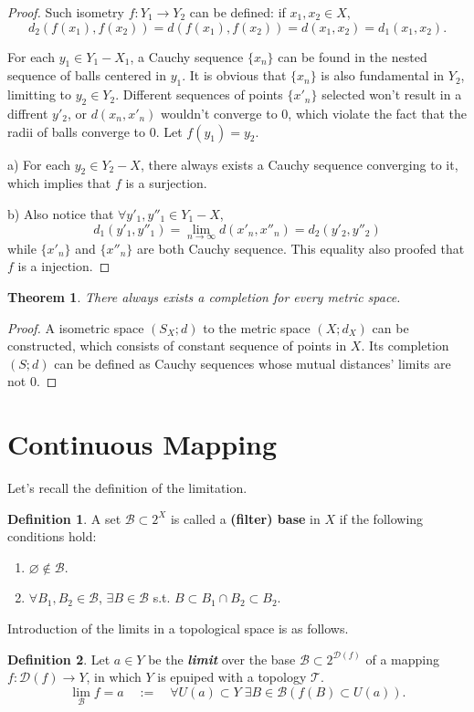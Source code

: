 \documentclass[openany]{book}
\newcommand*{\indexbf}[1]{\emph{\textbf{#1}}\index{#1}} %
\theoremstyle{plain}
\newtheorem{theorem}{Theorem}[section] %
\theoremstyle{definition}
\newtheorem{definition}{Definition}[section] %
\begin{document}
\begin{proof}
Such isometry $f:Y_1\to Y_2$ can be defined: if $x_1,x_2\in X$, 
\[
	d_2( f(x_1) , f(x_2) )=d(f(x_1), f(x_2)) = d(x_1 , x_2)=d_1(x_1, x_2).
\]

For each $y_1\in Y_1 - X_1$, a Cauchy sequence $\{x_n\}$ can be found in the nested sequence of balls centered in $y_1$. It is obvious that $\{x_n\}$ is also fundamental in $Y_2$, limitting to $y_2\in Y_2$. Different sequences of points $\{x'_n\}$ selected won't result in a diffrent $y'_2$, or $d(x_n,x'_n)$ wouldn't converge to $0$, which violate the fact that the radii of balls converge to $0$. Let $f(y_1)=y_2$. 

a) For each $y_2\in Y_2 - X$, there always exists a Cauchy sequence converging to it, which implies that $f$ is a surjection.

b) Also notice that $\forall y'_1,y''_1\in Y_1 - X$,
\[
	d_1(y'_1,y''_1)= \lim_{n\to\infty} d(x'_n,x''_n)=d_2(y'_2,y''_2)
\]
while $\{x'_n\}$ and $\{x''_n\}$ are both Cauchy sequence. This equality also proofed that $f$ is a injection.
\end{proof}
\begin{theorem}\label{completion_exists}
There always exists a completion for every metric space.
\end{theorem}
\begin{proof}
	A isometric space $(S_X;d)$ to the metric space $(X;d_X)$ can be constructed, which consists of constant sequence of points in $X$. Its completion $(S;d)$ can be defined as Cauchy sequences whose mutual distances' limits are not $0$.
\end{proof}
\section{Continuous Mapping}
Let's recall the definition of the limitation.
\begin{definition}\label{filter_base}
A set $\mathscr{B}\subset 2^X$ is called a \textbf{(filter) base} in $X$ if the following conditions hold:
\begin{enumerate}[label=\alph*)]
\item $\varnothing \notin \mathscr{B}$.
\item $\forall B_1,B_2\in \mathscr{B}$, $\exists B\in \mathscr{B}$ s.t. $B\subset B_1\cap B_2\subset B_2$. 
\end{enumerate}
\end{definition}
Introduction of the limits in a topological space is as follows.
\begin{definition}\label{limit}
Let $a\in Y$ be the \indexbf{limit} over the base $\mathscr{B}\subset 2^{\mathscr{D}(f)}$ of a mapping $f:\mathscr{D}( f )\to Y$, in which $Y$ is epuiped with a topology $\mathscr{T}$. 
\[
	\lim_\mathscr{B} f = a 
	\quad:=\quad
	\forall U(a)\subset Y\;
	\exists B\in \mathscr{B}(f(B)\subset U(a)).
\]
\end{definition}
\end{document}
